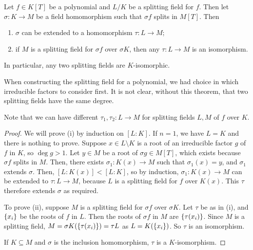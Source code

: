 \begin{theorem}
	Let \( f \in K[T] \) be a polynomial and \( L / K \) be a splitting field for \( f \).
	Then let \( \sigma \colon K \to M \) be a field homomorphism such that \( \sigma f \) splits in \( M[T] \).
	Then
	\begin{enumerate}
		\item \( \sigma \) can be extended to a homomorphism \( \tau \colon L \to M \);
		\item if \( M \) is a splitting field for \( \sigma f \) over \( \sigma K \), then any \( \tau \colon L \to M \) is an isomorphism.
	\end{enumerate}
	In particular, any two splitting fields are \( K \)-isomorphic.
\end{theorem}
\begin{remark}
	When constructing the splitting field for a polynomial, we had choice in which irreducible factors to consider first.
	It is not clear, without this theorem, that two splitting fields have the same degree.

	Note that we can have different \( \tau_1, \tau_2 \colon L \to M \) for splitting fields \( L, M \) of \( f \) over \( K \).
\end{remark}
\begin{proof}
	We will prove (i) by induction on \( [L : K] \).
	If \( n = 1 \), we have \( L = K \) and there is nothing to prove.
	Suppose \( x \in L \setminus K \) is a root of an irreducible factor \( g \) of \( f \) in \( K \), so \( \deg g > 1 \).
	Let \( y \in M \) be a root of \( \sigma g \in M[T] \), which exists because \( \sigma f \) splits in \( M \).
	Then, there exists \( \sigma_1 \colon K(x) \to M \) such that \( \sigma_1(x) = y \), and \( \sigma_1 \) extends \( \sigma \).
	Then, \( [L : K(x)] < [L : K] \), so by induction, \( \sigma_1 \colon K(x) \to M \) can be extended to \( \tau \colon L \to M \), because \( L \) is a splitting field for \( f \) over \( K(x) \).
	This \( \tau \) therefore extends \( \sigma \) as required.

	To prove (ii), suppose \( M \) is a splitting field for \( \sigma f \) over \( \sigma K \).
	Let \( \tau \) be as in (i), and \( \qty{x_i} \) be the roots of \( f \) in \( L \).
	Then the roots of \( \sigma f \) in \( M \) are \( \qty{\tau(x_i)} \).
	Since \( M \) is a splitting field, \( M = \sigma K(\qty{\tau(x_i)}) = \tau L \) as \( L = K(\qty{x_i}) \).
	So \( \tau \) is an isomorphism.

	If \( K \subseteq M \) and \( \sigma \) is the inclusion homomorphism, \( \tau \) is a \( K \)-isomorphism.
\end{proof}
